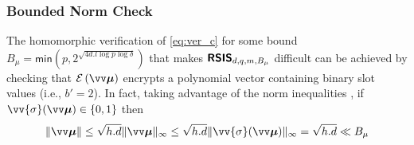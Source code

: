 


\subsubsection{Bounded Norm Check}\label{sec:bnc}

The homomorphic verification of \cref{eq:ver_c} for some bound $B_{\mu}=\textsf{min}(p,2^{\sqrt{4d.l\log{p}\log{\delta}}})$ that makes $\textsf{\textbf{RSIS}}_{d,q,m,B_{\mu}}$ difficult can be achieved by checking that $\enc{\pv{\mu}}$ encrypts a polynomial vector containing binary slot values (i.e., $b'=2$). In fact, taking advantage of the norm inequalities \cite{damgardMultipartyComputationSomewhat2012}, if $\vv{\sigma}(\pv{\mu}) \in \{0,1\}$ then
\[\|\pv{\mu}\| \le \sqrt{h.d}\|\pv{\mu}\|_{\infty} \le \sqrt{h.d}\|\vv{\sigma}(\pv{\mu})\|_{\infty} = \sqrt{h.d} \ll B_{\mu}\]



